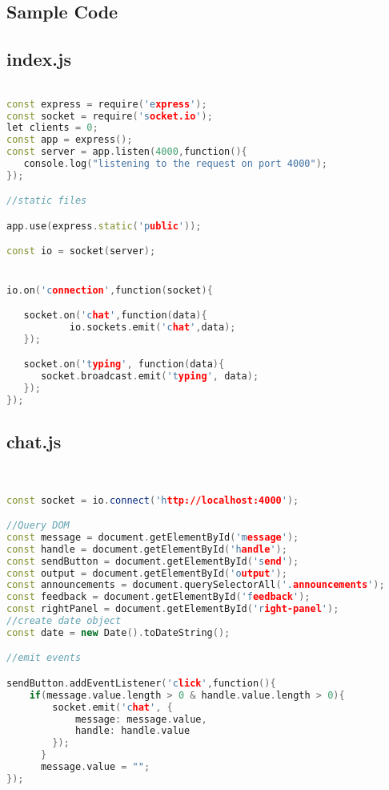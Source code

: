 \documentclass{fisatproject}
\begin{document}
\begin{appendices}
\chapter{Sample Code}
\section{index.js}
\begin{lstlisting}[language=c++]

const express = require('express');
const socket = require('socket.io');
let clients = 0;
const app = express();
const server = app.listen(4000,function(){
   console.log("listening to the request on port 4000");
});

//static files

app.use(express.static('public'));

const io = socket(server);


io.on('connection',function(socket){

   socket.on('chat',function(data){
           io.sockets.emit('chat',data);
   });

   socket.on('typing', function(data){
      socket.broadcast.emit('typing', data);
   });
});

\end{lstlisting}
\newpage
\section{chat.js}
\begin{lstlisting}[language=c++]


const socket = io.connect('http://localhost:4000');

//Query DOM
const message = document.getElementById('message');
const handle = document.getElementById('handle');
const sendButton = document.getElementById('send');
const output = document.getElementById('output');
const announcements = document.querySelectorAll('.announcements');
const feedback = document.getElementById('feedback');
const rightPanel = document.getElementById('right-panel');
//create date object
const date = new Date().toDateString();

//emit events

sendButton.addEventListener('click',function(){
    if(message.value.length > 0 & handle.value.length > 0){
        socket.emit('chat', {
            message: message.value,
            handle: handle.value
        });
      }
      message.value = "";
});


\end{lstlisting}
\end{appendices}
\end{document}
